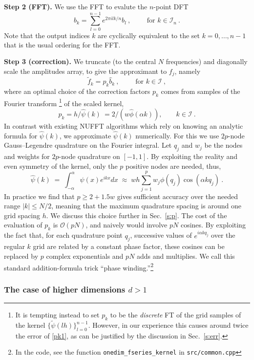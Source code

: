 \documentclass[10pt]{article}
\newcommand{\be}{\begin{equation}}
\newcommand{\ee}{\end{equation}}
\newcommand{\bigO}{{\mathcal O}}
\newcommand{\KK}{{\mathcal I}}     %
\newcommand{\ppsi}{{\tilde\psi}}   %
\newcommand{\al}{\alpha}           %
\begin{document}
{\bf Step 2 (FFT).}
We use the FFT to evalute the $n$-point DFT
\be
\hat{b}_k = \sum_{l=0}^{n-1} e^{2\pi i lk/n} b_l ~, \qquad \mbox{ for } k\in\KK_n
~.
\label{dft1}
\ee
Note that the output indices $k$ are cyclically equivalent to the
set $k=0,\dots,n-1$ that is the usual ordering for the FFT.

{\bf Step 3 (correction).}
We truncate (to the central $N$ frequencies) and
diagonally scale the amplitudes array, to give
the approximant to $f_j$, namely
\be
\tilde f_k = p_k \hat{b}_k ~, \qquad \mbox{ for } k\in\KK
~,
\label{pb1}
\ee
where an optimal choice of the correction factors $p_k$ comes from
samples of the Fourier transform%
\footnote{It is tempting instead to set $p_k$ to be the {\em discrete} FT
  of the grid samples of the kernel $\{\ppsi(lh)\}_{l=0}^{n-1}$.
  However, in our
  experience this causes around twice the error of \eqref{pk1},
  as can be justified by the discussion in Sec.~\ref{s:err}.}
of the scaled kernel,
\be p_k = h / \hat\psi(k)~ = 2/(w\hat\phi(\alpha k)), \qquad k\in\KK
\label{pk1}
~.
\ee
In contrast with existing NUFFT algorithms
which rely on knowing an analytic formula for $\hat\psi(k)$,
we approximate $\hat\psi(k)$
numerically. For this we use $2p$-node Gauss--Legendre quadrature
on the Fourier integral. Let $q_j$ and $w_j$ be the nodes and weights
for $2p$-node quadrature on $[-1,1]$.
By exploiting the reality and even symmetry of the kernel,
only the $p$ positive nodes are needed, thus,
$$
\hat\psi(k) \;=\; 
\int_{-\al}^{\al} \psi(x) e^{ikx} dx
\;\approx\;
wh \sum_{j=1}^p w_j \phi(q_j) \cos (\al k q_j)
~.
$$
In practice we find that $p\ge 2+1.5 w$ gives sufficient accuracy
over the needed range $|k|\le N/2$,
meaning that the maximum quadrature spacing is around one
grid spacing $h$.
We discuss this choice further in Sec.~\ref{s:p}.
The cost of the evaluation of $p_k$ is $\bigO(pN)$,
and naively would involve $pN$ cosines.
By exploiting the fact that, for each quadrature point $q_j$,
successive values of $e^{i \al k q_j}$ over the regular $k$ grid are
related by a constant phase factor, these cosines
can be replaced by $p$ complex exponentials and $pN$ adds and multiplies.
We call this standard addition-formula trick
``phase winding.''\footnote{In the code, see the function
  {\tt onedim\_fseries\_kernel} in {\tt src/common.cpp}}
  


\subsubsection{The case of higher dimensions $d>1$}
\end{document}
